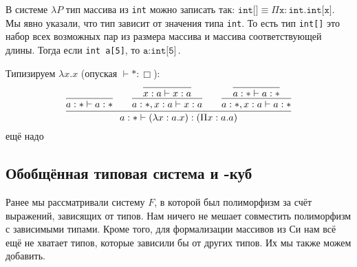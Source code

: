 В системе $\lambda P$ тип массива из \texttt{int} можно записать так:
$\texttt{int[]} \equiv \Pi \texttt{x} : \texttt{int}.\texttt{int[x]}$.
Мы явно указали, что тип зависит от значения типа \texttt{int}.
То есть тип \texttt{int[]} это набор всех возможных пар из размера массива и массива соответствующей длины.
Тогда если \texttt{int a[5]}, то $\texttt{a}:\texttt{int[5]}$.

\begin{example}
Типизируем $\lambda x . x$ (опуская $\vdash * : \Box$):
\[
    \infer{a : * \vdash (\lambda x : a . x) : (\Pi x : a . a)}
        { \infer{a : * \vdash a : *}{}
        &&\infer{a : *, x : a \vdash x : a}{\infer{x : a \vdash x : a}{}}
        &&\infer{a : *, x : a \vdash a : *}{\infer{a : * \vdash a : *}{}}
        }
\]
\todo ещё надо
\end{example}

\subsection{\texorpdfstring{Обобщённая типовая система и \textlambda-куб}{Generalized type system and lambda cube}}

Ранее мы рассматривали систему $F$, в которой был полиморфизм за счёт выражений, зависящих от типов.
Нам ничего не мешает совместить полиморфизм с зависимыми типами.
Кроме того, для формализации массивов из Си нам всё ещё не хватает типов, которые зависили бы от других типов.
Их мы также можем добавить.

